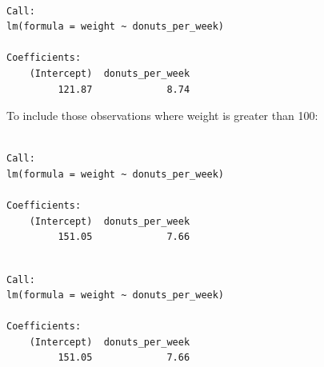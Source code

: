 \documentclass[]{book}
\newenvironment{Shaded}{\begin{snugshade}}{\end{snugshade}}
\newcommand{\DecValTok}[1]{\textcolor[rgb]{0.00,0.00,0.81}{#1}}
\newcommand{\KeywordTok}[1]{\textcolor[rgb]{0.13,0.29,0.53}{\textbf{#1}}}
\newcommand{\NormalTok}[1]{#1}
\newcommand{\OperatorTok}[1]{\textcolor[rgb]{0.81,0.36,0.00}{\textbf{#1}}}
\newcommand{\StringTok}[1]{\textcolor[rgb]{0.31,0.60,0.02}{#1}}
\begin{document}
\begin{Shaded}
\end{Shaded}

\begin{verbatim}

Call:
lm(formula = weight ~ donuts_per_week)

Coefficients:
    (Intercept)  donuts_per_week  
         121.87             8.74  
\end{verbatim}

To include those observations where weight is greater than 100:

\begin{Shaded}
\end{Shaded}

\begin{verbatim}

Call:
lm(formula = weight ~ donuts_per_week)

Coefficients:
    (Intercept)  donuts_per_week  
         151.05             7.66  
\end{verbatim}

\begin{Shaded}
\end{Shaded}

\begin{verbatim}

Call:
lm(formula = weight ~ donuts_per_week)

Coefficients:
    (Intercept)  donuts_per_week  
         151.05             7.66  
\end{verbatim}
\end{document}
